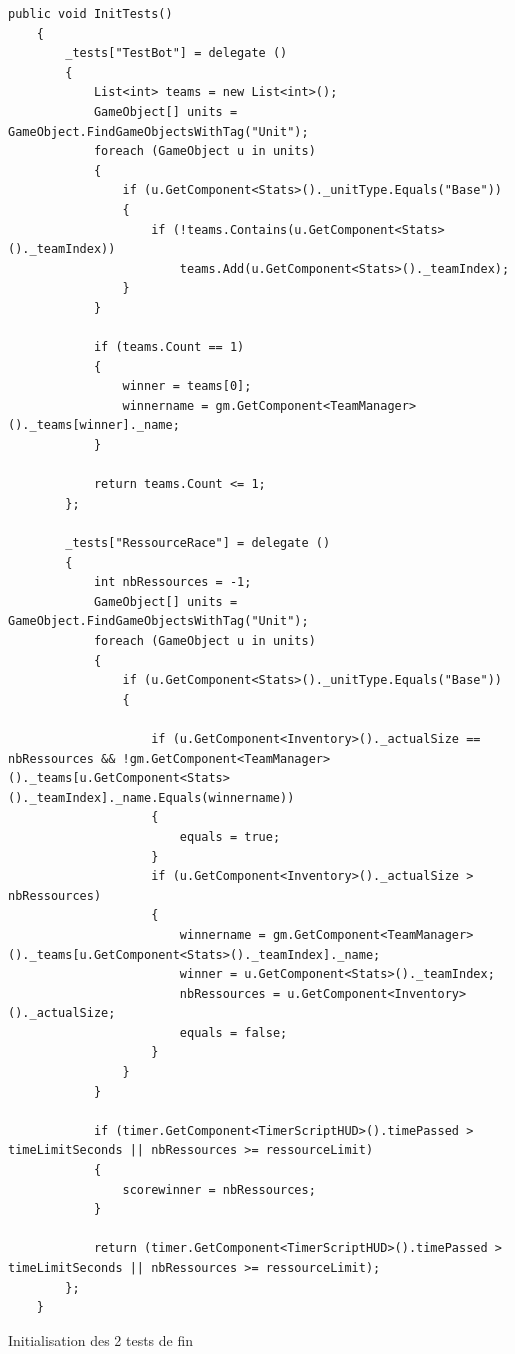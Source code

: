 \documentclass{report}
\begin{document}
\begin{lstlisting}[frame=single]
 public void InitTests()
    {
        _tests["TestBot"] = delegate ()
        {
            List<int> teams = new List<int>();
            GameObject[] units = GameObject.FindGameObjectsWithTag("Unit");
            foreach (GameObject u in units)
            {
                if (u.GetComponent<Stats>()._unitType.Equals("Base"))
                {
                    if (!teams.Contains(u.GetComponent<Stats>()._teamIndex))
                        teams.Add(u.GetComponent<Stats>()._teamIndex);
                }
            }

            if (teams.Count == 1)
            {
                winner = teams[0];
                winnername = gm.GetComponent<TeamManager>()._teams[winner]._name;
            }

            return teams.Count <= 1;
        };

        _tests["RessourceRace"] = delegate ()
        {
            int nbRessources = -1;
            GameObject[] units = GameObject.FindGameObjectsWithTag("Unit");
            foreach (GameObject u in units)
            {
                if (u.GetComponent<Stats>()._unitType.Equals("Base"))
                {

                    if (u.GetComponent<Inventory>()._actualSize == nbRessources && !gm.GetComponent<TeamManager>()._teams[u.GetComponent<Stats>()._teamIndex]._name.Equals(winnername))
                    {
                        equals = true;
                    }
                    if (u.GetComponent<Inventory>()._actualSize > nbRessources)
                    {
                        winnername = gm.GetComponent<TeamManager>()._teams[u.GetComponent<Stats>()._teamIndex]._name;
                        winner = u.GetComponent<Stats>()._teamIndex;
                        nbRessources = u.GetComponent<Inventory>()._actualSize;
                        equals = false;
                    }
                }
            }

            if (timer.GetComponent<TimerScriptHUD>().timePassed > timeLimitSeconds || nbRessources >= ressourceLimit)
            {
                scorewinner = nbRessources;
            }

            return (timer.GetComponent<TimerScriptHUD>().timePassed > timeLimitSeconds || nbRessources >= ressourceLimit);
        };
    }

\end{lstlisting}
 {Initialisation des 2 tests de fin}
\end{document}
